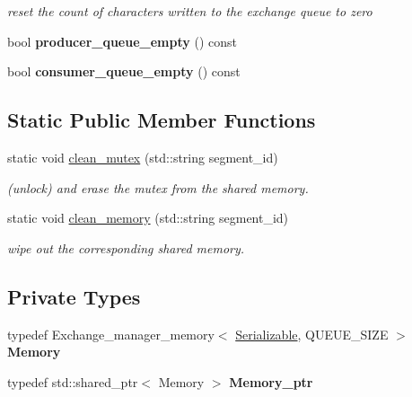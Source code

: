 \begin{DoxyCompactItemize}
\begin{DoxyCompactList}\small\item\em reset the count of characters written to the exchange queue to zero \end{DoxyCompactList}\item 
\mbox{\label{classshared__memory_1_1Exchange__manager__producer_a4a38c8c14004bc46d254375a63f62096}} 
bool {\bfseries producer\+\_\+queue\+\_\+empty} () const
\item 
\mbox{\label{classshared__memory_1_1Exchange__manager__producer_ab8f5eef0601cfdb418eb5d521bfa33d0}} 
bool {\bfseries consumer\+\_\+queue\+\_\+empty} () const
\end{DoxyCompactItemize}
\subsection*{Static Public Member Functions}
\begin{DoxyCompactItemize}
\item 
static void \hyperlink{classshared__memory_1_1Exchange__manager__producer_af98fe4321e1fd280b509f5dfd2cf4a5b}{clean\+\_\+mutex} (std\+::string segment\+\_\+id)
\begin{DoxyCompactList}\small\item\em (unlock) and erase the mutex from the shared memory. \end{DoxyCompactList}\item 
static void \hyperlink{classshared__memory_1_1Exchange__manager__producer_a8574f4e075d6f755e567d21d04f24aab}{clean\+\_\+memory} (std\+::string segment\+\_\+id)
\begin{DoxyCompactList}\small\item\em wipe out the corresponding shared memory. \end{DoxyCompactList}\end{DoxyCompactItemize}
\subsection*{Private Types}
\begin{DoxyCompactItemize}
\item 
\mbox{\label{classshared__memory_1_1Exchange__manager__producer_a65119cf07c0c10f167c191c9ee913029}} 
typedef Exchange\+\_\+manager\+\_\+memory$<$ \hyperlink{classSerializable}{Serializable}, Q\+U\+E\+U\+E\+\_\+\+S\+I\+ZE $>$ {\bfseries Memory}
\item 
\mbox{\label{classshared__memory_1_1Exchange__manager__producer_a7f3d7760ca2d1c01fa88e7a6447a38d7}} 
typedef std\+::shared\+\_\+ptr$<$ Memory $>$ {\bfseries Memory\+\_\+ptr}
\end{DoxyCompactItemize}
